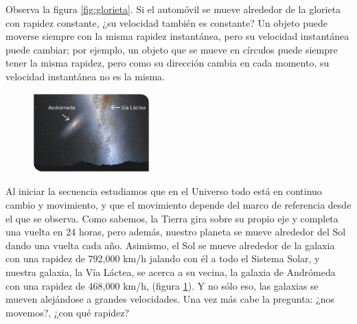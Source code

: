\documentclass[11pt]{book}
\begin{document}
Observa la figura \ref{fig:glorieta}. Si el automóvil se mueve alrededor de la glorieta
con rapidez constante, ¿su velocidad también es constante? Un objeto puede moverse siempre
con la misma rapidez instantánea, pero su velocidad instantánea puede cambiar; por ejemplo,
un objeto que se mueve en círculos puede siempre tener la misma rapidez, pero como su dirección
cambia en cada momento, su velocidad instantánea no es la misma.

\begin{figure}[H]
  \centering
  \includegraphics[width=0.4\textwidth]{galax.jpg}
  \label{fig:galax}
\end{figure}

Al iniciar la secuencia estudiamos que en el Universo todo está en continuo cambio y movimiento,
y que el movimiento depende del marco de referencia desde el que se observa. Como sabemos,
la Tierra gira sobre su propio eje y completa una vuelta en 24 horas, pero además, nuestro
planeta se mueve alrededor del Sol dando una vuelta cada año. Asimismo, el Sol se mueve alrededor
de la galaxia con una rapidez de 792,000 km/h jalando con él a todo el Sistema Solar, y nuestra
galaxia, la Vía Láctea, se acerca a su vecina, la galaxia de Andrómeda con una rapidez de
468,000 km/h, (figura \ref{fig:galax}). Y no sólo eso, las galaxias se mueven alejándose a grandes
velocidades. Una vez más cabe la pregunta: ¿nos movemos?, ¿con qué rapidez?
\end{document}
